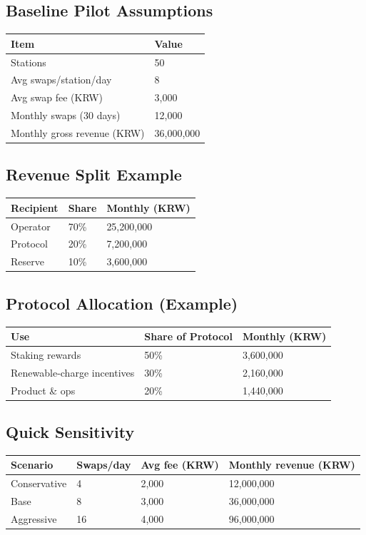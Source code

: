 \documentclass[12pt,a4paper]{article}
\begin{document}
\subsection{Baseline Pilot Assumptions}
\begin{tabular}{@{}ll@{}}
\toprule
Item & Value \\
\midrule
Stations & 50 \\
Avg swaps/station/day & 8 \\
Avg swap fee (KRW) & 3,000 \\
Monthly swaps (30 days) & 12,000 \\
Monthly gross revenue (KRW) & 36,000,000 \\
\bottomrule
\end{tabular}

\subsection{Revenue Split Example}
\begin{tabular}{@{}lll@{}}
\toprule
Recipient & Share & Monthly (KRW) \\
\midrule
Operator & 70\% & 25,200,000 \\
Protocol & 20\% & 7,200,000 \\
Reserve & 10\% & 3,600,000 \\
\bottomrule
\end{tabular}

\subsection{Protocol Allocation (Example)}
\begin{tabular}{@{}lll@{}}
\toprule
Use & Share of Protocol & Monthly (KRW) \\
\midrule
Staking rewards & 50\% & 3,600,000 \\
Renewable-charge incentives & 30\% & 2,160,000 \\
Product \& ops & 20\% & 1,440,000 \\
\bottomrule
\end{tabular}

\subsection{Quick Sensitivity}
\begin{tabular}{@{}llll@{}}
\toprule
Scenario & Swaps/day & Avg fee (KRW) & Monthly revenue (KRW) \\
\midrule
Conservative & 4 & 2,000 & 12,000,000 \\
Base & 8 & 3,000 & 36,000,000 \\
Aggressive & 16 & 4,000 & 96,000,000 \\
\bottomrule
\end{tabular}
\end{document}
